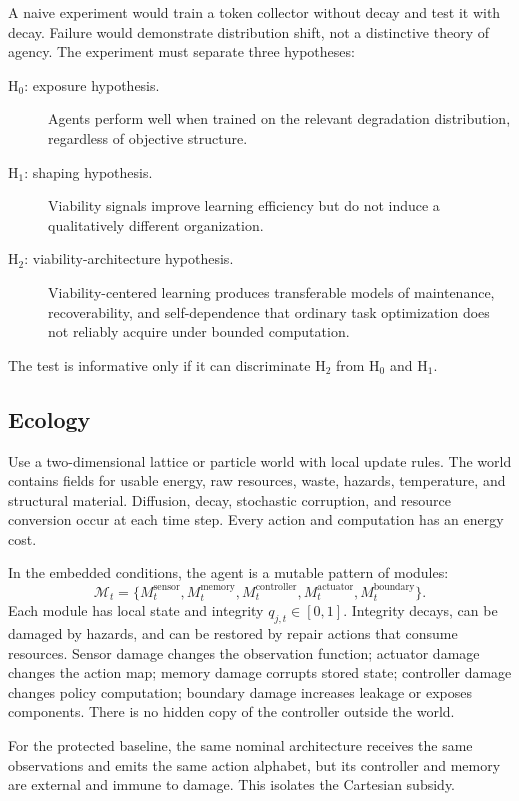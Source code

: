 \documentclass[11pt]{article}
\begin{document}
A naive experiment would train a token collector without decay and test it with decay. Failure would demonstrate distribution shift, not a distinctive theory of agency. The experiment must separate three hypotheses:
\begin{description}
\item[H$_0$: exposure hypothesis.] Agents perform well when trained on the relevant degradation distribution, regardless of objective structure.
\item[H$_1$: shaping hypothesis.] Viability signals improve learning efficiency but do not induce a qualitatively different organization.
\item[H$_2$: viability-architecture hypothesis.] Viability-centered learning produces transferable models of maintenance, recoverability, and self-dependence that ordinary task optimization does not reliably acquire under bounded computation.
\end{description}
The test is informative only if it can discriminate H$_2$ from H$_0$ and H$_1$.

\subsection{Ecology}

Use a two-dimensional lattice or particle world with local update rules. The world contains fields for usable energy, raw resources, waste, hazards, temperature, and structural material. Diffusion, decay, stochastic corruption, and resource conversion occur at each time step. Every action and computation has an energy cost.

In the embedded conditions, the agent is a mutable pattern of modules:
\begin{equation}
\mathcal M_t
=
\{M^{\mathrm{sensor}}_t,M^{\mathrm{memory}}_t,
M^{\mathrm{controller}}_t,M^{\mathrm{actuator}}_t,
M^{\mathrm{boundary}}_t\}.
\end{equation}
Each module has local state and integrity $q_{j,t}\in[0,1]$. Integrity decays, can be damaged by hazards, and can be restored by repair actions that consume resources. Sensor damage changes the observation function; actuator damage changes the action map; memory damage corrupts stored state; controller damage changes policy computation; boundary damage increases leakage or exposes components. There is no hidden copy of the controller outside the world.

For the protected baseline, the same nominal architecture receives the same observations and emits the same action alphabet, but its controller and memory are external and immune to damage. This isolates the Cartesian subsidy.
\end{document}
